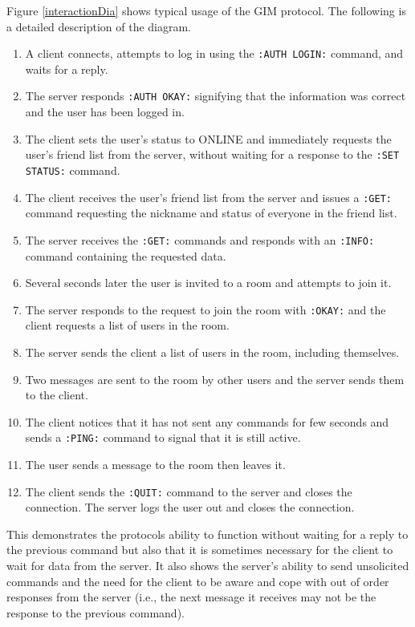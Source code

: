 Figure \ref{interactionDia} shows typical usage of the GIM protocol. The following is a detailed description of the diagram.

\begin{enumerate}
\item{A client connects, attempts to log in using the \texttt{:AUTH LOGIN:} command, and waits for a reply.}
\item{The server responds \texttt{:AUTH OKAY:} signifying that the information was correct and the user has been logged in.}
\item{The client sets the user's status to ONLINE and immediately requests the user's friend list from the server, without waiting for a response to the \texttt{:SET STATUS:} command.}
\item{The client receives the user's friend list from the server and issues a \texttt{:GET:} command requesting the nickname and status of everyone in the friend list.}
\item{The server receives the \texttt{:GET:} commands and responds with an \texttt{:INFO:} command containing the requested data.}
\item{Several seconds later the user is invited to a room and attempts to join it.}
\item{The server responds to the request to join the room with \texttt{:OKAY:} and the client requests a list of users in the room.}
\item{The server sends the client a list of users in the room, including themselves.}
\item{Two messages are sent to the room by other users and the server sends them to the client.}
\item{The client notices that it has not sent any commands for few seconds and sends a \texttt{:PING:} command to signal that it is still active.}
\item{The user sends a message to the room then leaves it.}
\item{The client sends the \texttt{:QUIT:} command to the server and closes the connection. The server logs the user out and closes the connection.}
\end{enumerate}

This demonstrates the protocols ability to function without waiting for a reply to the previous command but also that it is sometimes necessary for the client to wait for data from the server. It also shows the server's ability to send unsolicited commands and the need for the client to be aware and cope with out of order responses from the server (i.e., the next message it receives may not be the response to the previous command).

